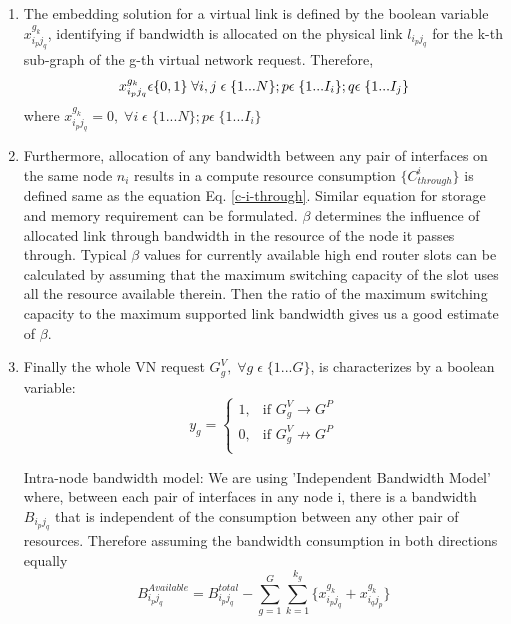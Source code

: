 \documentclass[article,dr=phil,type=msc ,colorback,accentcolor=tud4b]{tudthesis}
\begin{document}
\begin{enumerate}[label=(\Alph*)]
\begin{enumerate}
		\item The embedding solution for a virtual link is defined by the boolean variable $x_{i_{p}j_{q}}^{g_{k}}$, identifying if bandwidth is allocated on the physical link $l_{i_{p}j_{q}}$ for the k-th sub-graph of the g-th virtual network request. Therefore, 
		\begin{equation}
		x_{i_{p}j_{q}}^{g_{k}} \epsilon \{0, 1\} \;\forall i, j \;\epsilon\; \{1...N\}; p \epsilon \; \{1...I_{i}\}; q \epsilon \; \{1...I_{j}\}\\
		\end{equation}
		where $x_{i_{p}j_{q}}^{g_{k}} = 0, \; \forall i \;\epsilon\; \{1...N\}; p \epsilon \; \{1...I_{i}\}$\newline
		\item Furthermore, allocation of any bandwidth between any pair of interfaces on the same node $n_{i}$ results in a compute resource consumption $\{C^{i}_{through}\}$ is defined same as the equation Eq. \ref{c-i-through}. Similar equation for storage and memory requirement can be formulated. $\beta$ determines the influence of allocated link through bandwidth in the resource of the node it passes through. Typical $\beta$ values for currently available high end router slots can be calculated by assuming that the maximum switching capacity of the slot uses all the resource available therein. Then the ratio of the maximum switching capacity to the maximum supported link bandwidth gives us a good estimate of $\beta$.
		
		\item 	Finally the whole VN request  $G_{g}^{V}, \; \forall g \;\epsilon\; \{1...G\}$, is characterizes by a boolean variable:
		\begin{equation}
		y_{g}=
		\begin{cases}
		1, & \text{if }   G_{g}^{V}\rightarrow G^{P} \\
		0, & \text{if }   G_{g}^{V}\not\rightarrow G^{P} \\
		\end{cases}
		\end{equation}
		
		Intra-node bandwidth model: We are using 'Independent Bandwidth Model' where, between each pair of interfaces in any node i, there is a bandwidth $B_{i_{p}j_{q}}$ that is independent of the consumption between any other pair of resources. Therefore assuming the bandwidth consumption in both directions equally
		\begin{equation}
		B_{i_{p}j_{q}}^{Available} = B_{i_{p}j_{q}}^{total} -  \sum_{g=1}^{G} \sum_{k=1}^{k_{g}}  \{ x_{i_{p}j_{q}}^{g_{k}} + x_{i_{q}j_{p}}^{g_{k}}\}
		\end{equation}
	\end{enumerate}
	

\end{enumerate}
\end{document}
